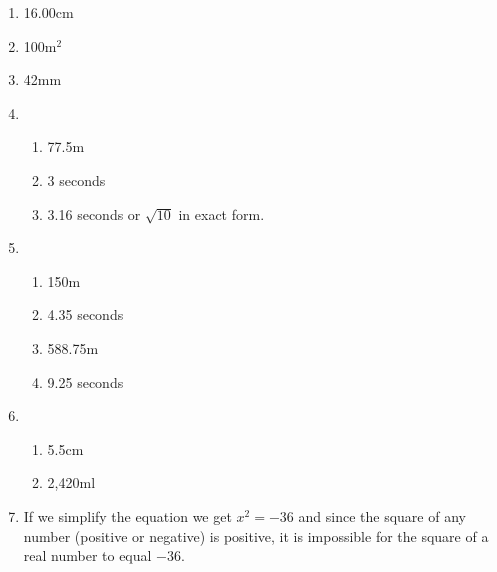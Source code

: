 \documentclass[a4paper,12pt]{article}
\begin{document}
\begin{enumerate}
\item 16.00cm

\item 100m$^2$

\item 42mm

\item
    \begin{enumerate}
    \item 77.5m
    \item 3 seconds
    \item 3.16 seconds or $\sqrt{10}$ in exact form.
    \end{enumerate}

\item
    \begin{enumerate}
    \item 150m
    \item 4.35 seconds
    \item 588.75m
    \item 9.25 seconds
    \end{enumerate}

\item
    \begin{enumerate}
    \item 5.5cm
    \item 2,420ml
    \end{enumerate}

\item If we simplify  the equation we get $x^2 = -36$ and since
the square of any number (positive or negative) is positive, it 
is impossible for the square of a real number to equal $-36$.

\end{enumerate}
\end{document}
